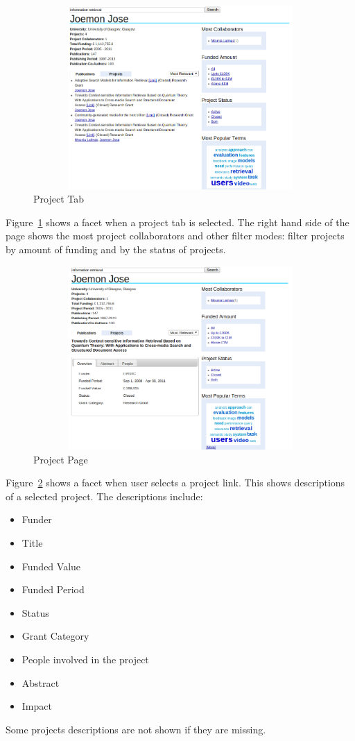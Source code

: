  \begin{figure}
 \centering
 \includegraphics[width=13cm,height=7cm,keepaspectratio]{./figures/newPofilePageProject.png}
 \caption{Project Tab} \label{fig:newPofilePageProject} 
 \end{figure}
 Figure~\ref{fig:newPofilePageProject} shows a facet when a project tab is selected. The right hand side of the page shows the most project collaborators
 and other filter modes: filter projects by amount of funding and by the status of projects.
 
 \begin{figure}
 \centering
 \includegraphics[width=13cm,height=7cm,keepaspectratio]{./figures/newProfileSelectedProject.png}
 \caption{Project Page} \label{fig:newProfileSelectedProject} 
 \end{figure}
 
 Figure~\ref{fig:newProfileSelectedProject} shows a facet when user selects a project link. This shows descriptions of a selected project.
 The descriptions include:
 \begin{itemize}
  \item Funder
  \item Title
  \item Funded Value
  \item Funded Period
  \item Status
  \item Grant Category
  \item People involved in the project
  \item Abstract
  \item Impact
 \end{itemize}
 Some projects descriptions are not shown if they are missing.




